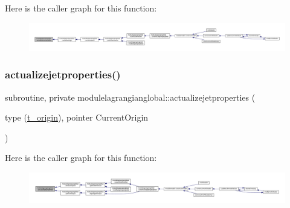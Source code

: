 Here is the caller graph for this function\+:\nopagebreak
\begin{figure}[H]
\begin{center}
\leavevmode
\includegraphics[width=350pt]{namespacemodulelagrangianglobal_a9011e7719eb353ee72ecbd6bce3e7ac1_icgraph}
\end{center}
\end{figure}
\mbox{\label{namespacemodulelagrangianglobal_a26ef74f75ff18c16e01e326e85d7920c}} 
\subsubsection{\texorpdfstring{actualizejetproperties()}{actualizejetproperties()}}
{\footnotesize\ttfamily subroutine, private modulelagrangianglobal\+::actualizejetproperties (\begin{DoxyParamCaption}\item[{type (\mbox{\hyperlink{structmodulelagrangianglobal_1_1t__origin}{t\+\_\+origin}}), pointer}]{Current\+Origin }\end{DoxyParamCaption})\hspace{0.3cm}{\ttfamily [private]}}

Here is the caller graph for this function\+:\nopagebreak
\begin{figure}[H]
\begin{center}
\leavevmode
\includegraphics[width=350pt]{namespacemodulelagrangianglobal_a26ef74f75ff18c16e01e326e85d7920c_icgraph}
\end{center}
\end{figure}
\mbox{\label{namespacemodulelagrangianglobal_a0fa07eb74ec148c5c6faeec4cd4561c9}} 
